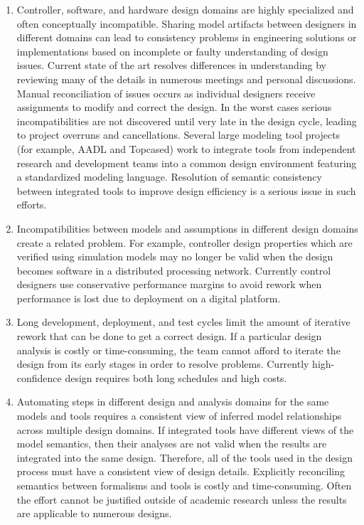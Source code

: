 \begin{enumerate}
 \item Controller, software, and hardware design 
domains are highly specialized and often conceptually
incompatible.  Sharing model artifacts between 
designers in different domains can lead to consistency
problems in engineering solutions or implementations
based on incomplete or faulty understanding 
of design issues.  Current state of the art resolves 
differences in understanding by reviewing many of the details in 
numerous meetings and personal discussions.  
Manual reconciliation of issues occurs as individual
designers receive assignments to modify and correct 
the design. In the worst 
cases serious incompatibilities are not discovered 
until very late in the design cycle, leading to project 
overruns and cancellations\cite{prog:rapid_dev}.
Several large modeling tool projects 
(for example, AADL \cite{modeling:aadl_control_systems}
and Topcased\cite{tools:Topcased}) work to integrate tools 
from independent research and development teams into a 
common design environment featuring a standardized 
modeling language.  Resolution of semantic consistency
between integrated tools to improve design efficiency 
is a serious issue in such efforts.

 \item Incompatibilities between models and assumptions 
in different design domains create a related problem.  
For example, controller design properties which are verified 
using simulation models may no longer be valid
when the design becomes software in a distributed 
processing network.  Currently control designers 
use conservative performance margins to avoid rework 
when performance is lost due to deployment on a 
digital platform.

 \item Long development, deployment, and test cycles 
limit the amount of iterative rework that can be done
to get a correct design.  If a particular design analysis
is costly or time-consuming, the team cannot afford to 
iterate the design from its early stages in order to resolve
problems.  Currently high-confidence 
design requires both long schedules and high costs.

 \item Automating steps in different design and analysis 
domains for the same models and tools requires a consistent 
view of inferred model relationships across multiple design 
domains.  If integrated tools have different views of the 
model semantics, then their analyses are not valid when 
the results are integrated into the same design.
Therefore, all of the tools used in the design process must have a 
consistent view of design details.  Explicitly reconciling semantics 
between formalisms and tools is costly and time-consuming.  
Often the effort cannot be justified outside of academic 
research unless the results are applicable to numerous designs.


\end{enumerate}
